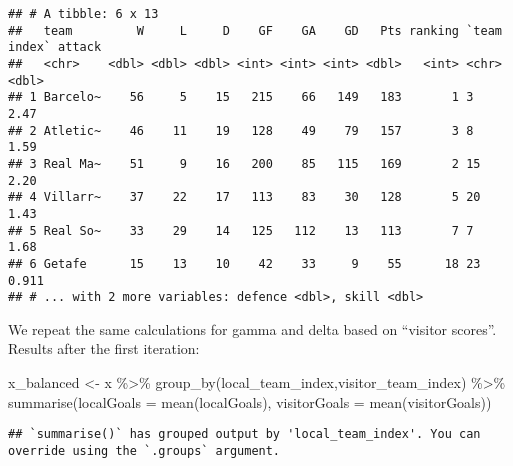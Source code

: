 \documentclass[
]{article}
\newenvironment{Shaded}{\begin{snugshade}}{\end{snugshade}}
\newcommand{\AttributeTok}[1]{\textcolor[rgb]{0.77,0.63,0.00}{#1}}
\newcommand{\FunctionTok}[1]{\textcolor[rgb]{0.00,0.00,0.00}{#1}}
\newcommand{\NormalTok}[1]{#1}
\newcommand{\OtherTok}[1]{\textcolor[rgb]{0.56,0.35,0.01}{#1}}
\newcommand{\SpecialCharTok}[1]{\textcolor[rgb]{0.00,0.00,0.00}{#1}}
\begin{document}
\begin{verbatim}
## # A tibble: 6 x 13
##   team         W     L     D    GF    GA    GD   Pts ranking `team index` attack
##   <chr>    <dbl> <dbl> <dbl> <int> <int> <int> <dbl>   <int> <chr>         <dbl>
## 1 Barcelo~    56     5    15   215    66   149   183       1 3             2.47 
## 2 Atletic~    46    11    19   128    49    79   157       3 8             1.59 
## 3 Real Ma~    51     9    16   200    85   115   169       2 15            2.20 
## 4 Villarr~    37    22    17   113    83    30   128       5 20            1.43 
## 5 Real So~    33    29    14   125   112    13   113       7 7             1.68 
## 6 Getafe      15    13    10    42    33     9    55      18 23            0.911
## # ... with 2 more variables: defence <dbl>, skill <dbl>
\end{verbatim}

We repeat the same calculations for gamma and delta based on ``visitor
scores''. Results after the first iteration:

\begin{Shaded}
\begin{Highlighting}[]
\NormalTok{x\_balanced }\OtherTok{\textless{}{-}}\NormalTok{ x }\SpecialCharTok{\%\textgreater{}\%}
  \FunctionTok{group\_by}\NormalTok{(local\_team\_index,visitor\_team\_index) }\SpecialCharTok{\%\textgreater{}\%}
  \FunctionTok{summarise}\NormalTok{(}\AttributeTok{localGoals =} \FunctionTok{mean}\NormalTok{(localGoals),}
        \AttributeTok{visitorGoals =} \FunctionTok{mean}\NormalTok{(visitorGoals))}
\end{Highlighting}
\end{Shaded}

\begin{verbatim}
## `summarise()` has grouped output by 'local_team_index'. You can override using the `.groups` argument.
\end{verbatim}
\end{document}
